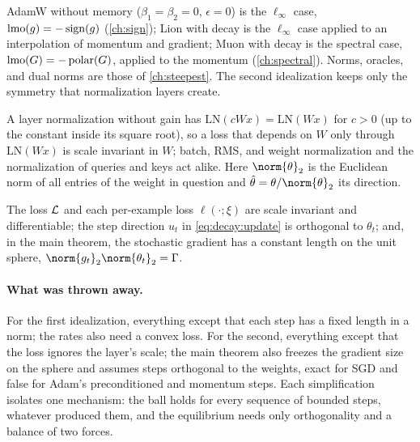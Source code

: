 \begin{refsection}
AdamW without memory ($\beta_1=\beta_2=0$, $\epsilon=0$) is the $\ell_\infty$ case, $\operatorname{lmo}(g)=-\operatorname{sign}(g)$ (\cref{ch:sign}); Lion with decay is the $\ell_\infty$ case applied to an interpolation of momentum and gradient; Muon with decay is the spectral case, $\operatorname{lmo}(G)=-\operatorname{polar}(G)$, applied to the momentum (\cref{ch:spectral}). Norms, oracles, and dual norms are those of \cref{ch:steepest}. The second idealization keeps only the symmetry that normalization layers create.


A layer normalization without gain has $\mathrm{LN}(cWx)=\mathrm{LN}(Wx)$ for $c>0$ (up to the constant inside its square root), so a loss that depends on $W$ only through $\mathrm{LN}(Wx)$ is scale invariant in $W$; batch, RMS, and weight normalization and the normalization of queries and keys act alike. Here $\norm{\theta}_2$ is the Euclidean norm of all entries of the weight in question and $\hat\theta=\theta/\norm{\theta}_2$ its direction.

\begin{assumption}\label{ass:decay:sphere}
The loss $\mathcal{L}$ and each per-example loss $\ell(\cdot;\xi)$ are scale invariant and differentiable; the step direction $u_t$ in \eqref{eq:decay:update} is orthogonal to $\theta_t$; and, in the main theorem, the stochastic gradient has a constant length on the unit sphere, $\norm{g_t}_2\norm{\theta_t}_2=\Gamma$.
\end{assumption}

\paragraph{What was thrown away.} For the first idealization, everything except that each step has a fixed length in a norm; the rates also need a convex loss. For the second, everything except that the loss ignores the layer's scale; the main theorem also freezes the gradient size on the sphere and assumes steps orthogonal to the weights, exact for SGD and false for Adam's preconditioned and momentum steps. Each simplification isolates one mechanism: the ball holds for every sequence of bounded steps, whatever produced them, and the equilibrium needs only orthogonality and a balance of two forces.


\end{refsection}
